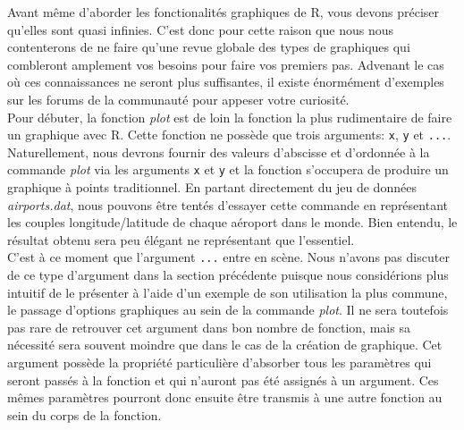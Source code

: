 Avant même d'aborder les fonctionalités graphiques de R, vous devons préciser qu'elles sont quasi infinies. C'est donc pour cette raison que nous nous contenterons de ne faire qu'une revue globale des types de graphiques qui combleront amplement vos besoins pour faire vos premiers pas. Advenant le cas où ces connaissances ne seront plus suffisantes, il existe énormément d'exemples sur les forums de la communauté pour appeser votre curiosité. \\

\noindent
Pour débuter, la fonction \emph{plot} est de loin la fonction la plus rudimentaire de faire un graphique avec R. Cette fonction ne possède que trois arguments: \texttt{x}, \texttt{y} et \texttt{...}. Naturellement, nous devrons fournir des valeurs d'abscisse et d'ordonnée à la commande \emph{plot} via les arguments \texttt{x} et \texttt{y} et la fonction s'occupera de produire un graphique à points traditionnel. En partant directement du jeu de données \emph{airports.dat}, nous pouvons être tentés d'essayer cette commande en représentant les couples longitude/latitude de chaque aéroport dans le monde. Bien entendu, le résultat obtenu sera peu élégant ne représentant que l'essentiel. \\

\noindent
C'est à ce moment que l'argument \texttt{...} entre en scène. Nous n'avons pas discuter de ce type d'argument dans la section précédente puisque nous considérions plus intuitif de le présenter à l'aide d'un exemple de son utilisation la plus commune, le passage d'options graphiques au sein de la commande \emph{plot}. Il ne sera toutefois pas rare de retrouver cet argument dans bon nombre de fonction, mais sa nécessité sera souvent moindre que dans le cas de la création de graphique. Cet argument possède la propriété particulière d'absorber tous les paramètres qui seront passés à la fonction et qui n'auront pas été assignés à un argument. Ces mêmes paramètres pourront donc ensuite être transmis à une autre fonction au sein du corps de la fonction. \\

